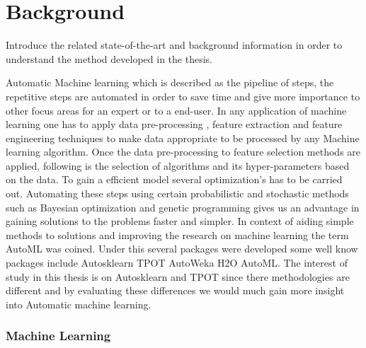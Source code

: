 \chapter{Background}\label{chap:background}


Introduce the related state-of-the-art and background information in order to understand the method developed in the thesis. 

Automatic Machine learning which is described as the pipeline of steps, the repetitive steps are automated in order to save time and give more importance to other focus areas for an expert or to a end-user. In any application of machine learning one has to apply data pre-processing , feature extraction and feature engineering techniques to make data appropriate to be processed by any Machine learning algorithm. Once the data pre-processing to feature selection methods are applied, following is the selection of algorithms and its hyper-parameters based on the data. To gain a efficient model several optimization's has to be carried out. Automating these steps using certain probabilistic and stochastic methods such as Bayesian optimization and genetic programming gives us an advantage in gaining solutions to the problems faster and simpler. In context of aiding simple methods to solutions and improving the research on machine learning the term AutoML\cite{autoML} was coined. Under this several packages were developed some well know packages include Autosklearn\cite{autosklearn} TPOT\cite{tpot} AutoWeka\cite{autoweka-Thornton:2013:ACS:2487575.2487629} H2O AutoML. The interest of study in this thesis is on Autosklearn and TPOT since there methodologies are different and by evaluating these differences we would much gain more insight into Automatic machine learning.

\subsection{Machine Learning}

